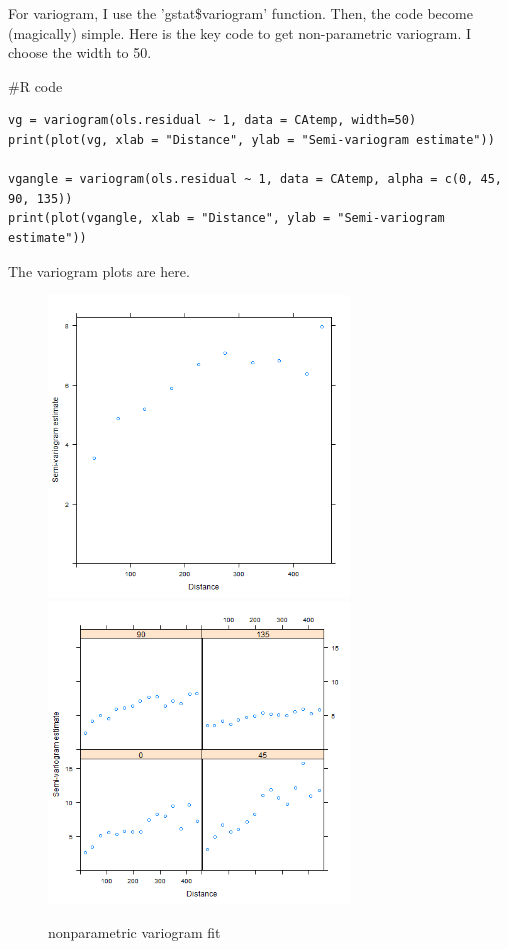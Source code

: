 \documentclass{article}
\newenvironment{Rcode}%
{%
    \begin{mdframed}
    \#R code
    \begin{small}
}
{%
    \end{small}
    \end{mdframed}
}
\begin{document}
For variogram, I use the 'gstat\$variogram' function. Then, the code become (magically) simple.
Here is the key code to get non-parametric variogram. I choose the width to 50.

\begin{Rcode}
    \begin{verbatim}
vg = variogram(ols.residual ~ 1, data = CAtemp, width=50)
print(plot(vg, xlab = "Distance", ylab = "Semi-variogram estimate"))

vgangle = variogram(ols.residual ~ 1, data = CAtemp, alpha = c(0, 45, 90, 135))
print(plot(vgangle, xlab = "Distance", ylab = "Semi-variogram estimate"))
    \end{verbatim}
\end{Rcode}


The variogram plots are here. 
\begin{figure}[!h]
    \centering
    \includegraphics[height=8cm]{prob2_CAtemp_variogram.png}
    \includegraphics[height=8cm]{prob2_CAtemp_variogram_angle.png}
    \caption{nonparametric variogram fit}
\end{figure}
\end{document}
